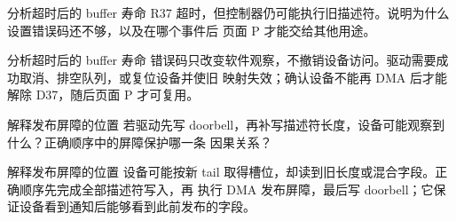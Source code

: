 \begin{chapterexercise}{分析超时后的 buffer 寿命}
R37 超时，但控制器仍可能执行旧描述符。说明为什么设置错误码还不够，以及在哪个事件后
页面 P 才能交给其他用途。
\end{chapterexercise}

\begin{chapteranswer}{分析超时后的 buffer 寿命}
错误码只改变软件观察，不撤销设备访问。驱动需要成功取消、排空队列，或复位设备并使旧
映射失效；确认设备不能再 DMA 后才能解除 D37，随后页面 P 才可复用。
\end{chapteranswer}

\begin{chapterexercise}{解释发布屏障的位置}
若驱动先写 doorbell，再补写描述符长度，设备可能观察到什么？正确顺序中的屏障保护哪一条
因果关系？
\end{chapterexercise}

\begin{chapteranswer}{解释发布屏障的位置}
设备可能按新 tail 取得槽位，却读到旧长度或混合字段。正确顺序先完成全部描述符写入，再
执行 DMA 发布屏障，最后写 doorbell；它保证设备看到通知后能够看到此前发布的字段。
\end{chapteranswer}

